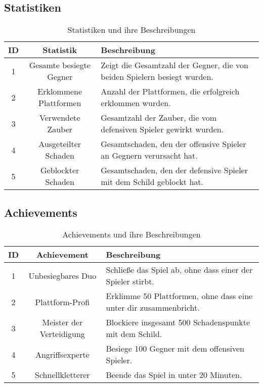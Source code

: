 \documentclass[11pt]{article}
\begin{document}
\begin{table}[htbp]
\subsection{Statistiken}
\centering
\begin{tabular}{ |c|c|p{}| }
\hline
\textbf{ID} & \textbf{Statistik} & \textbf{Beschreibung} \\
\hline
1 & Gesamte besiegte Gegner & Zeigt die Gesamtzahl der Gegner, die von beiden Spielern besiegt wurden. \\
\hline
2 & Erklommene Plattformen & Anzahl der Plattformen, die erfolgreich erklommen wurden. \\
\hline
3 & Verwendete Zauber & Gesamtzahl der Zauber, die vom defensiven Spieler gewirkt wurden. \\
\hline
4 & Ausgeteilter Schaden & Gesamtschaden, den der offensive Spieler an Gegnern verursacht hat. \\
\hline
5 & Geblockter Schaden & Gesamtschaden, den der defensive Spieler mit dem Schild geblockt hat. \\
\hline
\end{tabular}
\caption{Statistiken und ihre Beschreibungen}
\end{table}

\begin{table}[htbp]
\subsection{Achievements}
\centering
\begin{tabular}{ |c|c|p{}| }
\hline
\textbf{ID} & \textbf{Achievement} & \textbf{Beschreibung} \\
\hline
1 & Unbesiegbares Duo & Schließe das Spiel ab, ohne dass einer der Spieler stirbt. \\
\hline
2 & Plattform-Profi & Erklimme 50 Plattformen, ohne dass eine unter dir zusammenbricht. \\
\hline
3 & Meister der Verteidigung & Blockiere insgesamt 500 Schadenspunkte mit dem Schild. \\
\hline
4 & Angriffsexperte & Besiege 100 Gegner mit dem offensiven Spieler. \\
\hline
5 & Schnellkletterer & Beende das Spiel in unter 20 Minuten.\\
\hline
\end{tabular}
\caption{Achievements und ihre Beschreibungen}
\end{table}
\newpage
\end{document}
